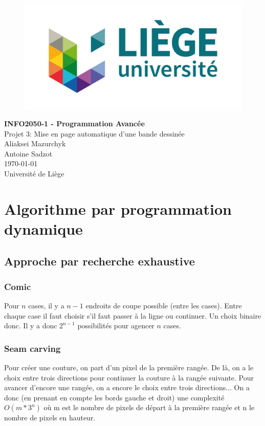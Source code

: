 \documentclass[10pt]{article}
\begin{document}
\begin{titlepage}

   \begin{figure}[htbp]
      \centering
      \includegraphics{uliege-logo-couleurs-300.jpg}
   \end{figure}
  	
  	\hfill

	\begin{center}
		\vfill
		\textbf{
		\Huge{INFO2050-1 - Programmation Avancée}}\\
		\bigskip
		\huge{Projet 3: Mise en page automatique d'une bande dessinée}\\
		\bigskip %
		\smallskip
		\Large{Aliaksei Mazurchyk\\Antoine Sadzot}\\
		\bigskip
		\smallskip
		\large{\today}\\%
		\vfill
		\large{Université de Liège}
	\end{center}
\end{titlepage}
\clearpage
\clearpage

\section{Algorithme par programmation dynamique}
\subsection{Approche par recherche exhaustive}
\subsubsection{Comic}
Pour $n$ cases, il y a $n-1$ endroits de coupe possible (entre les cases). Entre chaque case il faut choisir s'il faut passer à la ligne ou continuer. Un choix binaire donc. Il y a donc $2^{n-1}$ possibilités pour agencer $n$ cases.
\subsubsection{Seam carving}
Pour créer une couture, on part d'un pixel de la première rangée. De là, on a le choix entre trois directions pour continuer la couture à la rangée suivante. Pour avancer d'encore une rangée, on a encore le choix entre trois directions... On a donc (en prenant en compte les bords gauche et droit) une complexité $O(m*3^n)$ où m est le nombre de pixels de départ à la première rangée et n le nombre de pixels en hauteur.
\end{document}
